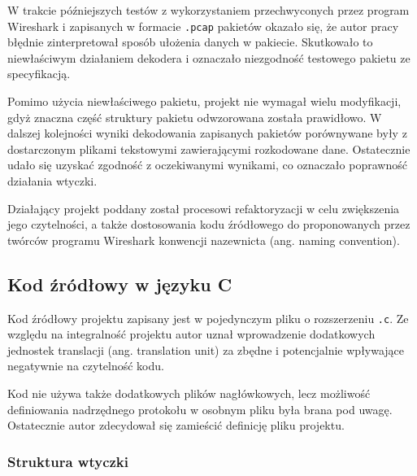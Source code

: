 \documentclass[a4paper, 12pt, twoside, openright]{article}
\begin{document}
	W trakcie późniejszych testów z wykorzystaniem przechwyconych przez program Wireshark i zapisanych w formacie \texttt{.pcap} pakietów
	okazało się, że autor pracy błędnie zinterpretował sposób ułożenia danych w pakiecie. Skutkowało to niewłaściwym działaniem
	dekodera i oznaczało niezgodność testowego pakietu ze specyfikacją.

	Pomimo użycia niewłaściwego pakietu, projekt nie wymagał wielu modyfikacji, gdyż znaczna część struktury pakietu odwzorowana została prawidłowo.
	W dalszej kolejności wyniki dekodowania zapisanych pakietów porównywane były z dostarczonym plikami tekstowymi zawierającymi rozkodowane dane.
	Ostatecznie udało się uzyskać zgodność z oczekiwanymi wynikami, co oznaczało poprawność działania wtyczki.

	Działający projekt poddany został procesowi refaktoryzacji w celu zwiększenia jego czytelności, a także dostosowania kodu źródłowego
	do proponowanych przez twórców programu Wireshark konwencji nazewnicta (ang. naming convention).

	\subsection{Kod źródłowy w języku C}

	\indent\par
	Kod źródłowy projektu zapisany jest w pojedynczym pliku o rozszerzeniu \texttt{.c}. Ze względu na integralność projektu autor uznał
	wprowadzenie dodatkowych jednostek translacji (ang. translation unit) za zbędne i potencjalnie wpływające negatywnie na czytelność kodu.

	Kod nie używa także dodatkowych plików nagłówkowych, lecz możliwość definiowania nadrzędnego protokołu w osobnym pliku była brana pod uwagę.
	Ostatecznie autor zdecydował się zamieścić definicję pliku projektu.

	\subsubsection{Struktura wtyczki}
\end{document}

